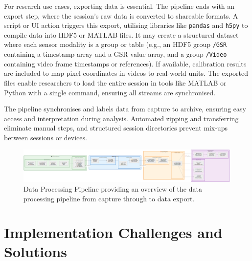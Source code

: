 For research use cases, exporting data is essential. The pipeline ends with an export step, where the session's raw data is converted to shareable formats. A script or UI action triggers this export, utilising libraries like \texttt{pandas} \cite{ref23} and \texttt{h5py} \cite{ref24} to compile data into HDF5 or MATLAB files. It may create a structured dataset where each sensor modality is a group or table (e.g., an HDF5 group \texttt{/GSR} containing a timestamp array and a GSR value array, and a group \texttt{/Video} containing video frame timestamps or references). If available, calibration results are included to map pixel coordinates in videos to real-world units. The exported files enable researchers to load the entire session in tools like MATLAB or Python with a single command, ensuring all streams are synchronised.

The pipeline synchronises and labels data from capture to archive, ensuring easy access and interpretation during analysis. Automated zipping and transferring eliminate manual steps, and structured session directories prevent mix-ups between sessions or devices.

\begin{figure}[htbp]
    \centring
    \includegraphics[width=\textwidth]{../diagrams/fig_4_06_data_processing_pipeline.png}
    \caption{Data Processing Pipeline providing an overview of the data processing pipeline from capture through to data export.}
    \label{fig:4_06_data_processing_pipeline_repeat}
\end{figure}


\section{Implementation Challenges and Solutions}\label{sec:4-6}

